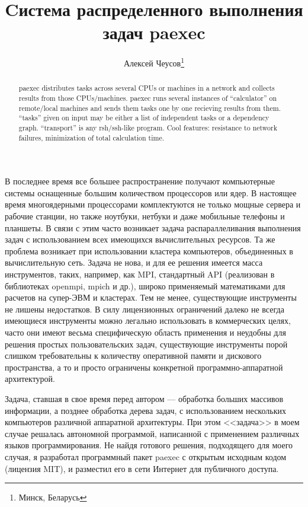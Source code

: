 \documentclass[10pt, a5paper]{article}
\begin{document}
\title{Cистема распределенного выполнения задач paexec }
\author{Алексей Чеусов\footnote{Минск, Беларусь}}
\def\progref!#1!{\texttt{#1}}

\maketitle

\begin{abstract}paexec distributes tasks across several CPUs or machines in a
network and collects results from those CPUs/machines. paexec runs
several instances of ``calculator'' on remote/local machines and sends
them tasks one by one recieving results from them. ``tasks'' given on
input may be either a list of independent tasks or a dependency
graph. ``transport'' is any rsh/ssh-like program. Cool features:
resistance to network failures, minimization of total calculation
time.
\end{abstract}

В последнее время все большее распространение получают компьютерные
системы оснащенные большим количеством процессоров или ядер.  В
настоящее время многоядерными процессорами комплектуются не только
мощные сервера и рабочие станции, но также ноутбуки, нетбуки и
даже мобильные телефоны и планшеты. В связи с этим часто возникает
задача распараллеливания выполнения задач с использованием всех
имеющихся вычислительных ресурсов. Та же проблема возникает при
использовании кластера компьютеров, объединенных в вычислительную
сеть. Задача не нова, и для ее решения имеется масса инструментов,
таких, например, как MPI, стандартный API (реализован в библиотеках
openmpi, mpich и др.), широко применяемый математиками для расчетов на
супер-ЭВМ и кластерах.  Тем не менее, существующие инструменты не
лишены недостатков.  В силу лицензионных ограничений далеко не всегда
имеющиеся инструменты можно легально использовать в коммерческих
целях, часто они имеют весьма специфическую область применения и
неудобны для решения простых пользовательских задач, существующие
инструменты порой слишком требовательны к количеству оперативной
памяти и дискового пространства, а то и просто ограничены конкретной
программно-аппаратной архитектурой.

Задача, ставшая в свое время перед автором --- обработка больших
массивов информации, а позднее обработка дерева задач, с
использованием нескольких компьютеров различной аппаратной
архитектуры. При этом <<задача>> в моем случае решалась автономной
программой, написанной с применением различных языков
программирования. Не найдя готового решения, подходящего для моего
случая, я разработал программный пакет paexec с открытым исходным
кодом (лицензия MIT), и разместил его в сети Интернет для публичного
доступа.
\end{document}
